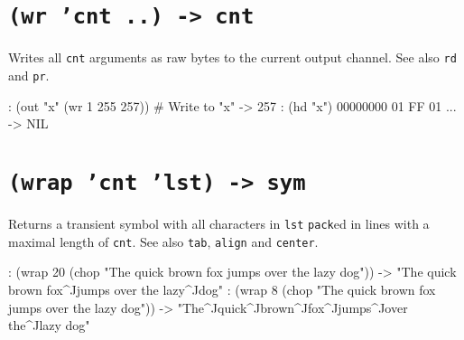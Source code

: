  
\section*{\texttt{(wr 'cnt ..) -> cnt}}
\label{sec:func-ref-W-(wr 'cnt ..) -> cnt}


Writes all \texttt{cnt} arguments as raw bytes to the current output channel.
See also \texttt{rd} and \texttt{pr}.


\begin{wideverbatim}
: (out "x" (wr 1 255 257))  # Write to "x"
-> 257
: (hd "x")
00000000  01 FF 01                                         ...
-> NIL
\end{wideverbatim}

 
\section*{\texttt{(wrap 'cnt 'lst) -> sym}}
\label{sec:func-ref-W-(wrap 'cnt 'lst) -> sym}


Returns a transient symbol with all characters in \texttt{lst} \texttt{pack}ed in lines with a maximal length of \texttt{cnt}. See also \texttt{tab}, \texttt{align} and
\texttt{center}.


\begin{wideverbatim}
: (wrap 20 (chop "The quick brown fox jumps over the lazy dog"))
-> "The quick brown fox^Jjumps over the lazy^Jdog"
: (wrap 8 (chop "The quick brown fox jumps over the lazy dog"))
-> "The^Jquick^Jbrown^Jfox^Jjumps^Jover the^Jlazy dog"
\end{wideverbatim}


